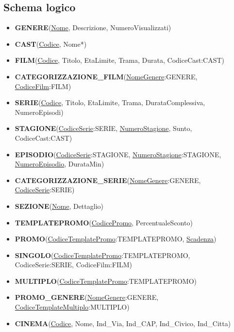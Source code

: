 \documentclass[a4paper,12pt]{report}
\begin{document}
\subsection{Schema logico}
\begin{itemize} %
	\item \textbf{GENERE}(\underline{Nome}, Descrizione, NumeroVisualizzati)
	
	\item \textbf{CAST}(\underline{Codice}, Nome*)
	
	\item \textbf{FILM}(\underline{Codice}, Titolo, EtaLimite, Trama, Durata, CodiceCast:CAST)
	\item \textbf{CATEGORIZZAZIONE{\_}FILM}(\underline{NomeGenere}:GENERE, \underline{CodiceFilm}:FILM)
	
	\item \textbf{SERIE}(\underline{Codice}, Titolo, EtaLimite, Trama, DurataComplessiva, NumeroEpisodi)
	\item \textbf{STAGIONE}(\underline{CodiceSerie}:SERIE, \underline{NumeroStagione}, Sunto, CodiceCast:CAST)
	\item \textbf{EPISODIO}(\underline{CodiceSerie}:STAGIONE, \underline{NumeroStagione}:STAGIONE, \underline{NumeroEpisodio}, DurataMin)
	\item \textbf{CATEGORIZZAZIONE{\_}SERIE}(\underline{NomeGenere}:GENERE, \underline{CodiceSerie}:SERIE)
	
	\item \textbf{SEZIONE}(\underline{Nome}, Dettaglio)
	
	\item \textbf{TEMPLATEPROMO}(\underline{CodicePromo}, PercentualeSconto)
	\item \textbf{PROMO}(\underline{CodiceTemplatePromo}:TEMPLATEPROMO, \underline{Scadenza})
	\item \textbf{SINGOLO}(\underline{CodiceTemplatePromo}:TEMPLATEPROMO, CodiceSerie:SERIE, CodiceFilm:FILM)
	\item \textbf{MULTIPLO}(\underline{CodiceTemplatePromo}:TEMPLATEPROMO)
	\item \textbf{PROMO{\_}GENERE}(\underline{NomeGenere}:GENERE, \underline{CodiceTemplateMultiplo}:MULTIPLO)
	
	\item \textbf{CINEMA}(\underline{Codice}, Nome, Ind{\_}Via, Ind{\_}CAP, Ind{\_}Civico, Ind{\_}Citta)
	

\end{itemize}
\end{document}
